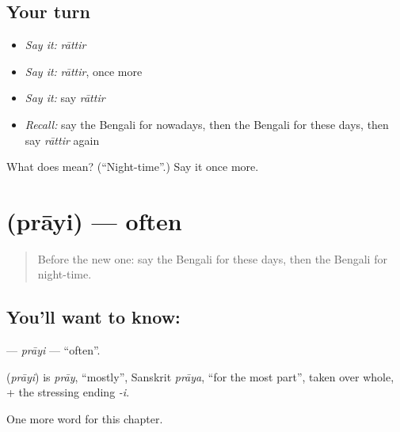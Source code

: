\subsection*{Your turn}
\begin{itemize}
\raggedright
  \item \emph{Say it:} \emph{rāttir}
  \item \emph{Say it:} \emph{rāttir}, once more
  \item \emph{Say it:} say \emph{rāttir}
  \item \emph{Recall:} say the Bengali for nowadays, then the Bengali for these days, then say \emph{rāttir} again
\end{itemize}

\begin{tcolorbox}[breakable,colback=teal!4,colframe=teal!35!black,title={Before you move on}]
What does  mean? (\textquotedblleft{}Night-time\textquotedblright{}.) Say it once more.
\end{tcolorbox}
\section[\texorpdfstring{\bn{প্রায়ই} (prāyi)}{প্রায়ই (prāyi)}]{ (prāyi) — often}

\label{lesson:BN-C94-prayi}



\begin{quote}
Before the new one: say the Bengali for these days, then the Bengali for night-time.
\end{quote}

\subsection*{You'll want to know: }
\textbf{} — \emph{prāyi} — \textquotedblleft{}often\textquotedblright{}.

\begin{cousinweb}
\textbf{} (\emph{prāyi}) is \emph{prāy}, \textquotedblleft{}mostly\textquotedblright{}, Sanskrit \emph{prāya}, \textquotedblleft{}for the most part\textquotedblright{}, taken over whole, + the stressing ending \emph{-i}.
\end{cousinweb}

\begin{grammarlens}[title={What you've built}]
One more word for this chapter.
\end{grammarlens}

